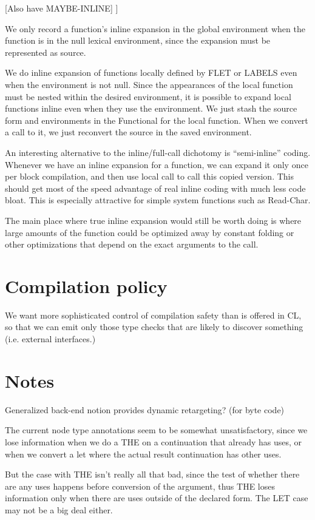 [Also have MAYBE-INLINE]
]

We only record a function's inline expansion in the global environment when the
function is in the null lexical environment, since the expansion must be
represented as source.

We do inline expansion of functions locally defined by FLET or LABELS even when
the environment is not null.  Since the appearances of the local function must
be nested within the desired environment, it is possible to expand local
functions inline even when they use the environment.  We just stash the source
form and environments in the Functional for the local function.  When we
convert a call to it, we just reconvert the source in the saved environment.

An interesting alternative to the inline/full-call dichotomy is ``semi-inline''
coding.  Whenever we have an inline expansion for a function, we can expand it
only once per block compilation, and then use local call to call this copied
version.  This should get most of the speed advantage of real inline coding
with much less code bloat.  This is especially attractive for simple system
functions such as Read-Char.

The main place where true inline expansion would still be worth doing is where
large amounts of the function could be optimized away by constant folding or
other optimizations that depend on the exact arguments to the call.



\section{Compilation policy}

We want more sophisticated control of compilation safety than is offered in CL,
so that we can emit only those type checks that are likely to discover
something (i.e. external interfaces.)



\section{Notes}

Generalized back-end notion provides dynamic retargeting?  (for byte code)

The current node type annotations seem to be somewhat unsatisfactory, since we
lose information when we do a THE on a continuation that already has uses, or
when we convert a let where the actual result continuation has other uses.  

But the case with THE isn't really all that bad, since the test of whether
there are any uses happens before conversion of the argument, thus THE loses
information only when there are uses outside of the declared form.  The LET
case may not be a big deal either.

